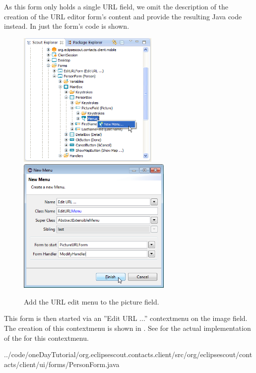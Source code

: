 \documentclass[a4paper,10pt,twoside]{book}
\begin{document}
As this form only holds a single URL field, we omit the description of the creation of the URL editor form's content and provide the resulting Java code instead. 
In  just the form's  code is shown. 

\begin{figure}
\includegraphics[height=6.6cm]{new_menu_editurl_contextmenu.png} \hspace{5mm}
\includegraphics[height=6.6cm]{new_menu_editurl.png}
\caption{Add the URL edit menu to the picture field.}
\end{figure}

This form is then started via an ''Edit URL ...'' contextmenu on the image field.
The creation of this contextmenu is shown in . 
See  for the actual implementation of the  for this contextmenu.


{../code/oneDayTutorial/org.eclipsescout.contacts.client/src/org/eclipsescout/contacts/client/ui/forms/PersonForm.java}
\end{document}
